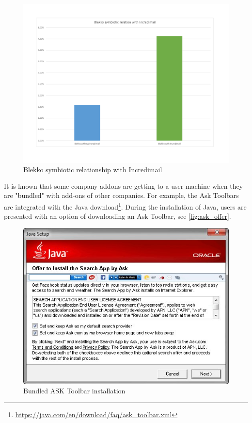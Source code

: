 \documentclass[11pt,oneside]{book}
\begin{document}
{{{{\begin{figure}[h]
\centering
\includegraphics[width=\linewidth]{figures/blekko_sym_incredi.pdf}
\caption{Blekko symbiotic relationship with Incredimail}
\label{fig:blekko_sym_incredi}
\end{figure}


It is known that some company addons are getting to a user machine when they are "bundled" with add-ons of other companies. For example, the Ask Toolbars are integrated with the Java download\footnote{\url{https://java.com/en/download/faq/ask_toolbar.xml}}. During the installation of Java, users are presented with an option of downloading an Ask Toolbar, see \autoref{fig:ask_offer}.
\begin{figure}[h]
\centering
\includegraphics[scale=.8,angle=0]{figures/ask_offer.png}
\caption{Bundled ASK Toolbar installation}
\label{fig:ask_offer}
\end{figure}


}}}}
\end{document}

